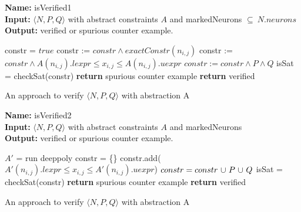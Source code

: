 \begin{algorithm}[t]
  \textbf{Name: } isVerified1 \\
  \textbf{Input: } $\langle N,P,Q \rangle$ with abstract constraints $A$ and markedNeurons $\subseteq ~ N.neurons$ \\
  \textbf{Output: } verified or spurious counter example. 
  \begin{algorithmic}[1]
    \State constr = $true$
          \State constr := $constr \land exactConstr(n_{i,j})$ 
        \Else
          \State constr := $constr \land A(n_{i,j}).lexpr \leq x_{i,j} \leq A(n_{i,j}).uexpr$
        \EndIf
      \EndFor
    \EndFor
    \State $constr := constr \land P \land Q$
    \State isSat = checkSat(constr)
      \State \textbf{return} spurious counter example
    \Else
      \State \textbf{return} verified
    \EndIf
  \end{algorithmic}
  \caption{An approach to verify $\langle N,P,Q \rangle$ with abstraction A}
  \label{algo:verif1}
\end{algorithm}

\begin{algorithm}[t]
  \textbf{Name: } isVerified2 \\
  \textbf{Input: } $\langle N,P,Q \rangle$ with abstract constraints $A$ and markedNeurons \\
  \textbf{Output: } verified or spurious counter example. 
  \begin{algorithmic}[1]
      \State $A'$ = run deeppoly
        \State constr = \{\}
            \State constr.add($A'(n_{i,j}).lexpr \leq x_{i,j} \leq A'(n_{i,j}).uexpr$)
          \EndFor
        \EndFor
        \State $constr = constr ~ {\cup} ~ P ~ {\cup} ~ Q$ 
        \State isSat = checkSat(constr)
          \State \textbf{return} spurious counter example
        \EndIf
      \EndIf
    \EndFor
    \State \textbf{return} verified
  \end{algorithmic}
  \caption{An approach to verify $\langle N,P,Q \rangle$ with abstraction A}
  \label{algo:verif2}
\end{algorithm}



